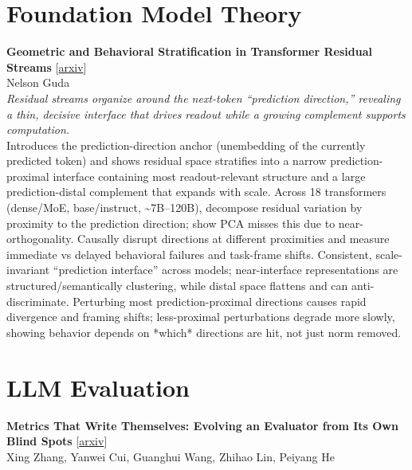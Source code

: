 \documentclass[12pt,letterpaper]{article}
\begin{document}
\medskip


\section*{Foundation Model Theory}

{\small\textbf{Geometric and Behavioral Stratification in Transformer Residual Streams}} {\scriptsize[\href{https://arxiv.org/abs/2608.12447}{arxiv}]}\\
{\scriptsize Nelson Guda}\\

{\small\textit{Residual streams organize around the next-token ``prediction direction,'' revealing a thin, decisive interface that drives readout while a growing complement supports computation.}}\\[1pt]
{\footnotesize Introduces the prediction-direction anchor (unembedding of the currently predicted token) and shows residual space stratifies into a narrow prediction-proximal interface containing most readout-relevant structure and a large prediction-distal complement that expands with scale. Across 18 transformers (dense/MoE, base/instruct, \textasciitilde{}7B--120B), decompose residual variation by proximity to the prediction direction; show PCA misses this due to near-orthogonality. Causally disrupt directions at different proximities and measure immediate vs delayed behavioral failures and task-frame shifts. Consistent, scale-invariant ``prediction interface'' across models; near-interface representations are structured/semantically clustering, while distal space flattens and can anti-discriminate. Perturbing most prediction-proximal directions causes rapid divergence and framing shifts; less-proximal perturbations degrade more slowly, showing behavior depends on *which* directions are hit, not just norm removed.}

\medskip


\section*{LLM Evaluation}

{\small\textbf{Metrics That Write Themselves: Evolving an Evaluator from Its Own Blind Spots}} {\scriptsize[\href{https://arxiv.org/abs/2608.18744}{arxiv}]}\\
{\scriptsize Xing Zhang, Yanwei Cui, Guanghui Wang, Zhihao Lin, Peiyang He}\\
\end{document}
